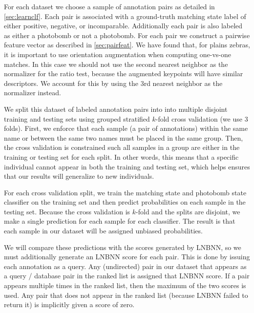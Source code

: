     For each dataset we choose a sample of annotation pairs as detailed in \cref{sec:learnclf}.
    Each pair is associated with a ground-truth matching state label of either positive, negative, or
      incomparable.
    Additionally each pair is also labeled as either a photobomb or not a photobomb.
    For each pair we construct a pairwise feature vector as described in \cref{sec:pairfeat}.
    We have found that, for plains zebras, it is important to use orientation augmentation when computing
      one-vs-one matches.
    In this case we should not use the second nearest neighbor as the normalizer for the ratio test, because the
      augmented keypoints will have similar descriptors.
    We account for this by using the 3rd nearest neighbor as the normalizer instead.

    We split this dataset of labeled annotation pairs into into multiple disjoint training and testing sets using
      grouped stratified $k$-fold cross validation (we use $3$ folds).
    First, we enforce that each sample (a pair of annotations) within the same name or between the same two names
      must be placed in the same group.
    Then, the cross validation is constrained such all samples in a group are either in the training or testing
      set for each split.
    In other words, this means that a specific individual cannot appear in both the training and testing set,
      which helps ensures that our results will generalize to new individuals.

    For each cross validation split, we train the matching state and photobomb state classifier on the training
      set and then predict probabilities on each sample in the testing set.
    Because the cross validation is $k$-fold and the splits are disjoint, we make a single prediction for each
      sample for each classifier.
    The result is that each sample in our dataset will be assigned unbiased probabilities.

    We will compare these predictions with the scores generated by LNBNN, so we must additionally generate an
      LNBNN score for each pair.
    This is done by issuing each annotation as a query.
    Any (undirected) pair in our dataset that appears as a query / database pair in the ranked list is assigned
      that LNBNN score.
    If a pair appears multiple times in the ranked list, then the maximum of the two scores is used.
    Any pair that does not appear in the ranked list (because LNBNN failed to return it) is implicitly given a
      score of zero.

